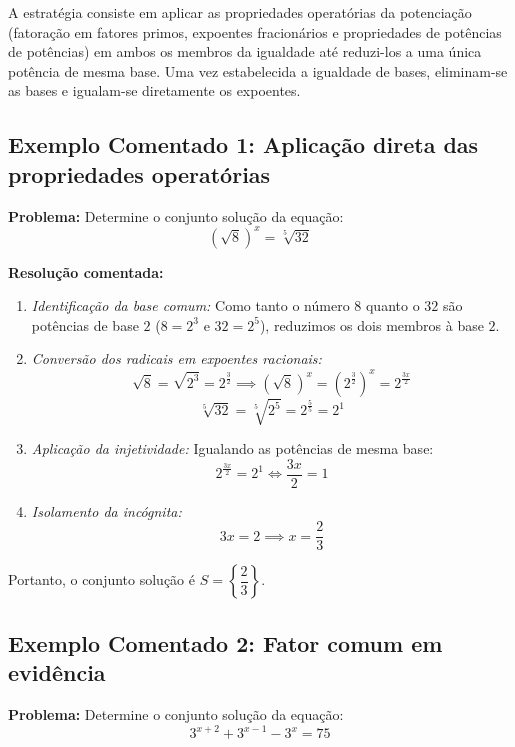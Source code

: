 \documentclass[12pt,a4paper]{report}
\begin{document}
	A estratégia consiste em aplicar as propriedades operatórias da potenciação (fatoração em fatores primos, expoentes fracionários e propriedades de potências de potências) em ambos os membros da igualdade até reduzi-los a uma única potência de mesma base. Uma vez estabelecida a igualdade de bases, eliminam-se as bases e igualam-se diretamente os expoentes.
	
	\subsection*{Exemplo Comentado 1: Aplicação direta das propriedades operatórias}
	
	\textbf{Problema:} Determine o conjunto solução da equação:
	\[
	\left( \sqrt{8} \right)^x = \sqrt[5]{32}
	\]
	
	\textbf{Resolução comentada:}
	\begin{enumerate}[label=\alph*)]
		\item \textit{Identificação da base comum:} Como tanto o número $8$ quanto o $32$ são potências de base $2$ ($8 = 2^3$ e $32 = 2^5$), reduzimos os dois membros à base $2$.
		\item \textit{Conversão dos radicais em expoentes racionais:}
		\[
		\sqrt{8} = \sqrt{2^3} = 2^{\frac{3}{2}} \implies \left( \sqrt{8} \right)^x = \left( 2^{\frac{3}{2}} \right)^x = 2^{\frac{3x}{2}}
		\]
		\[
		\sqrt[5]{32} = \sqrt[5]{2^5} = 2^{\frac{5}{5}} = 2^1
		\]
		\item \textit{Aplicação da injetividade:} Igualando as potências de mesma base:
		\[
		2^{\frac{3x}{2}} = 2^1 \iff \frac{3x}{2} = 1
		\]
		\item \textit{Isolamento da incógnita:}
		\[
		3x = 2 \implies x = \frac{2}{3}
		\]
	\end{enumerate}
	Portanto, o conjunto solução é $S = \left\{ \dfrac{2}{3} \right\}$.
	
	\vspace{0.3cm}
	
	\subsection*{Exemplo Comentado 2: Fator comum em evidência}
	
	\textbf{Problema:} Determine o conjunto solução da equação:
	\[
	3^{x+2} + 3^{x-1} - 3^x = 75
	\]
	
\end{document}
